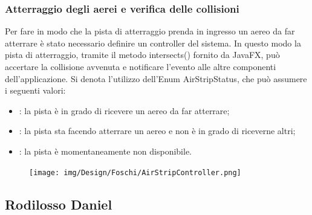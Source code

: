 \documentclass[a4paper,12pt]{report}
\begin{document}
\subsubsection{Atterraggio degli aerei e verifica delle collisioni}
Per fare in modo che la pista di atterraggio prenda in ingresso un aereo da far atterrare è stato necessario definire un controller del sistema. In questo modo la pista di atterraggio, tramite il metodo intersects() fornito da JavaFX, può accertare la collisione avvenuta e notificare l’evento alle altre componenti dell’applicazione. Si denota l’utilizzo dell’Enum AirStripStatus, che può assumere i seguenti valori:
\begin{itemize}
    \item {}: la pista è in grado di ricevere un aereo da far atterrare;
    \item {}: la pista sta facendo atterrare un aereo e non è in grado di riceverne altri;
    \item {}: la pista è momentaneamente non disponibile.
\end{itemize}
\begin{figure}[H]
    \begin{center}
        \centering
        \texttt{[image: img/Design/Foschi/AirStripController.png]}
    \end{center}
    \label{img:airstrip-controller}
\end{figure}

\clearpage

\subsection{Rodilosso Daniel}
\end{document}
